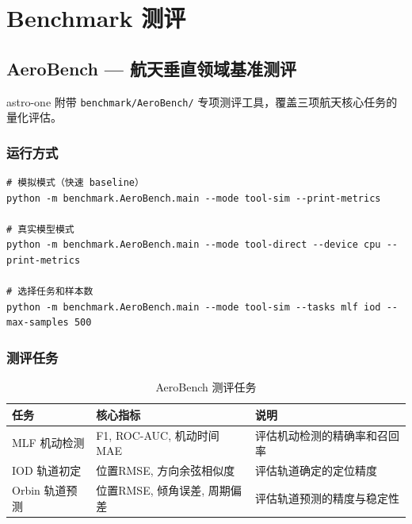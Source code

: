\documentclass[12pt,a4paper,UTF8]{ctexart}
\begin{document}
\chapter{Benchmark 测评}

\section{AeroBench — 航天垂直领域基准测评}

astro-one 附带 \texttt{benchmark/AeroBench/} 专项测评工具，覆盖三项航天核心任务的量化评估。

\subsection{运行方式}
\begin{verbatim}
# 模拟模式（快速 baseline）
python -m benchmark.AeroBench.main --mode tool-sim --print-metrics

# 真实模型模式
python -m benchmark.AeroBench.main --mode tool-direct --device cpu --print-metrics

# 选择任务和样本数
python -m benchmark.AeroBench.main --mode tool-sim --tasks mlf iod --max-samples 500
\end{verbatim}

\subsection{测评任务}
\begin{table}[H]
\centering
\begin{tabular}{L{3cm} L{4cm} L{8cm}}
\toprule
\textbf{任务} & \textbf{核心指标} & \textbf{说明} \\
\midrule
MLF 机动检测 & F1, ROC-AUC, 机动时间MAE & 评估机动检测的精确率和召回率 \\
IOD 轨道初定 & 位置RMSE, 方向余弦相似度 & 评估轨道确定的定位精度 \\
Orbin 轨道预测 & 位置RMSE, 倾角误差, 周期偏差 & 评估轨道预测的精度与稳定性 \\
\bottomrule
\end{tabular}
\caption{AeroBench 测评任务}
\end{table}

\end{document}

